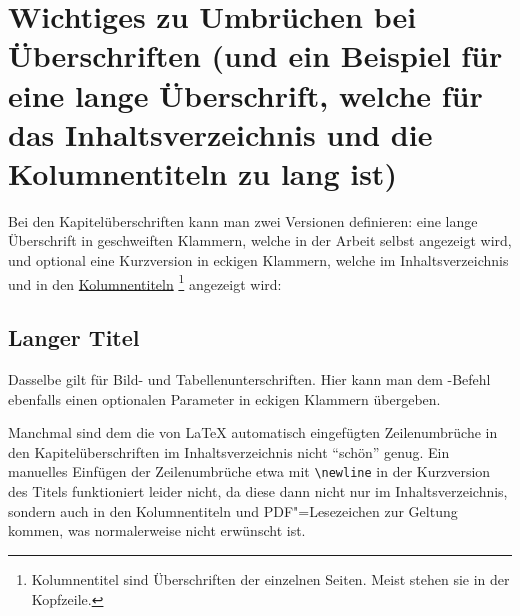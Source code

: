 \section[%
         Wichtiges zu Umbrüchen bei Überschriften
         \mbox{(Kurzversion für das Inhaltsverzeichnis etc.)}%
				]{%
         Wichtiges zu Umbrüchen bei Überschriften
         (und ein Beispiel \newline für eine lange Überschrift,
         welche \newline für das Inhaltsverzeichnis und 
         \newline die Kolumnentiteln zu lang ist)%
				}%
%
\label{sec:Titles}
%
%
Bei den Kapitelüberschriften kann man zwei Versionen definieren:
eine lange Überschrift in geschweiften Klammern, welche in der Arbeit selbst angezeigt wird, 
und optional eine Kurzversion in eckigen Klammern, welche im Inhaltsverzeichnis und in den 
\href{https://de.wikipedia.org/wiki/Kolumnentitel}{Kolumnentiteln}%
\footnote{Kolumnentitel sind Überschriften der einzelnen Seiten. Meist stehen sie in der Kopfzeile.}
angezeigt wird:
\begin{latex}
\section[Kurzversion]{Langer Titel}
\end{latex}
Dasselbe gilt für Bild- und Tabellenunterschriften. Hier kann man dem
-Befehl ebenfalls einen optionalen Parameter in eckigen Klammern übergeben.

Manchmal sind dem  die von \LaTeX{} automatisch eingefügten Zeilenumbrüche in den Kapitelüberschriften im Inhaltsverzeichnis nicht \enquote{schön} genug.
Ein manuelles Einfügen der Zeilenumbrüche etwa mit \verb+\newline+ in der Kurzversion des Titels funktioniert leider nicht,
da diese dann nicht nur im Inhaltsverzeichnis, sondern auch in den Kolumnentiteln und PDF"=Lesezeichen zur Geltung kommen, 
was normalerweise nicht erwünscht ist.

